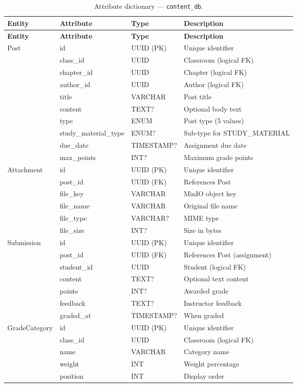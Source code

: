 \begin{longtable}{@{} l l l p{5.5cm} @{}}
  \caption{Attribute dictionary --- \texttt{content\_db}.} \label{tab:dict-content} \\
  \toprule
  \textbf{Entity} & \textbf{Attribute} & \textbf{Type} & \textbf{Description} \\
  \midrule
  \endfirsthead
  \toprule
  \textbf{Entity} & \textbf{Attribute} & \textbf{Type} & \textbf{Description} \\
  \midrule
  \endhead
  Post & id & UUID (PK) & Unique identifier \\
       & class\_id & UUID & Classroom (logical FK) \\
       & chapter\_id & UUID & Chapter (logical FK) \\
       & author\_id & UUID & Author (logical FK) \\
       & title & VARCHAR & Post title \\
       & content & TEXT? & Optional body text \\
       & type & ENUM & Post type (5 values) \\
       & study\_material\_type & ENUM? & Sub-type for STUDY\_MATERIAL \\
       & due\_date & TIMESTAMP? & Assignment due date \\
       & max\_points & INT? & Maximum grade points \\
  \midrule
  Attachment & id & UUID (PK) & Unique identifier \\
             & post\_id & UUID (FK) & References Post \\
             & file\_key & VARCHAR & MinIO object key \\
             & file\_name & VARCHAR & Original file name \\
             & file\_type & VARCHAR? & MIME type \\
             & file\_size & INT? & Size in bytes \\
  \midrule
  Submission & id & UUID (PK) & Unique identifier \\
             & post\_id & UUID (FK) & References Post (assignment) \\
             & student\_id & UUID & Student (logical FK) \\
             & content & TEXT? & Optional text content \\
             & points & INT? & Awarded grade \\
             & feedback & TEXT? & Instructor feedback \\
             & graded\_at & TIMESTAMP? & When graded \\
  \midrule
  GradeCategory & id & UUID (PK) & Unique identifier \\
                & class\_id & UUID & Classroom (logical FK) \\
                & name & VARCHAR & Category name \\
                & weight & INT & Weight percentage \\
                & position & INT & Display order \\
  \bottomrule
\end{longtable}

